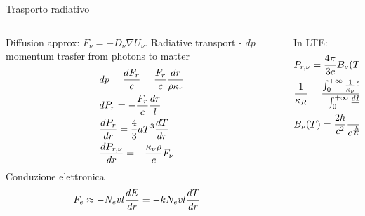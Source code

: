     \begin{frame}{Trasporto radiativo}
\begin{columns}[T]
	\begin{column}{0.5\textwidth}
Diffusion approx: $F_{\nu}=-D_{\nu}\nabla U_{\nu}$.
Radiative transport - $dp$ momentum trasfer from photons to matter
\begin{align*}
&dp=\frac{dF_r}{c}=\frac{F_r}{c}\frac{dr}{\rho\kappa_r}\\
&dP_r=-\frac{F_r}{c}\frac{dr}{l}\\
&\TDy{r}{P_r}=\frac{4}{3}aT^3\TDy{r}{T}\\
&\TDy{r}{P_{r,\nu}}=-\frac{\kappa_{\nu}\rho}{c}F_{\nu}
\end{align*}
Conduzione elettronica
\begin{align*}
&F_e\approx-N_evl\TDy{r}{E}=-kN_evl\TDy{r}{T}
\end{align*}
\end{column}
\begin{column}{0.5\textwidth}
In LTE:
\begin{align*}
&P_{r,\nu}=\frac{4\pi}{3c}B_{\nu}(T)\\
&\frac{1}{\kappa_R}=\frac{\intzi{}\frac{1}{\kappa_{\nu}}\TDy{T}{B_{\nu}(T)}\,d\nu}{\intzi{}\TDy{T}{B_{\nu}(T)}\,d\nu}\\
&\plankfnu{}
\end {align*}
\end{column}
\end{columns}
\end{frame}

